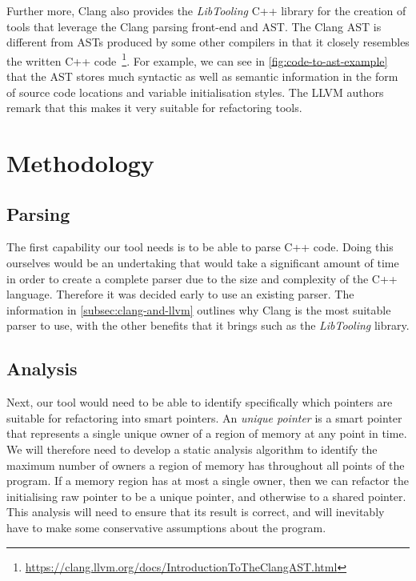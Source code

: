 \documentclass{mpaper}
\begin{document}
    Further more, Clang also provides the \emph{LibTooling} C++ library for the creation of tools that leverage the Clang parsing front-end and AST.
    The Clang AST is different from ASTs produced by some other compilers in that it closely resembles the written C++ code~\footnote{\url{https://clang.llvm.org/docs/IntroductionToTheClangAST.html}}.
    For example, we can see in \autoref{fig:code-to-ast-example} that the AST stores much syntactic as well as semantic information in the form of source code locations and variable initialisation styles.
    The LLVM authors remark that this makes it very suitable for refactoring tools.
    
    


    \section{Methodology}\label{sec:methodology}
    
    \subsection{Parsing}
    
    The first capability our tool needs is to be able to parse C++ code.
    Doing this ourselves would be an undertaking that would take a significant amount of time in order to create a complete parser due to the size and complexity of the C++ language. Therefore it was decided early to use an existing parser.
    The information in \autoref{subsec:clang-and-llvm} outlines why Clang is the most suitable parser to use, with the other benefits that it brings such as the \emph{LibTooling} library. 
    
    \subsection{Analysis}\label{subsec:methodology-analysis}
    
    Next, our tool would need to be able to identify specifically which pointers are suitable for refactoring into smart pointers.
    An \emph{unique pointer} is a smart pointer that represents a single unique owner of a region of memory at any point in time.
    We will therefore need to develop a static analysis algorithm to identify the maximum number of owners a region of memory has throughout all points of the program. 
    If a memory region has at most a single owner, then we can refactor the initialising raw pointer to be a unique pointer, and otherwise to a shared pointer.    
    This analysis will need to ensure that its result is correct, and will inevitably have to make some conservative assumptions about the program.
    
\end{document}
